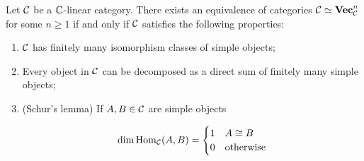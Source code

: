 \begin{prop}\label{higher-linear-algebra} Let ${\mathcal C}$ be a ${\mathbb C}$-linear category. There exists an equivalence of categories ${\mathcal C}\simeq {\bf Vec}_{{\mathcal C}}^n$ for some $n\geq 1$ if and only if ${\mathcal C}$ satisfies the following properties:

\begin{enumerate}
\item ${\mathcal C}$ has finitely many isomorphism classes of simple objects;
\item Every object in ${\mathcal C}$ can be decomposed as a direct sum of finitely many simple objects;
\item (Schur's lemma) If $A,B\in {\mathcal C}$ are simple objects

$$\dim\operatorname{Hom}_{{\mathcal C}}(A,B)=
\begin{cases}
1 & A\cong B\\
0 & \text{otherwise}
\end{cases}$$
\end{enumerate}

\end{prop}
